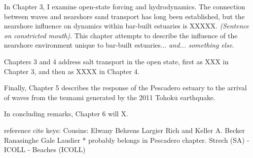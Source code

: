 In Chapter 3, I examine open-state forcing and hydrodynamics. The connection between waves and nearshore sand transport has long been established, but the nearshore influence on dynamics within bar-built estuaries is XXXXX. \emph{(Sentence on constricted mouth).} This chapter attempts to describe the influence of the nearshore environment unique to bar-built estuaries... \emph{and... something else}. 

Chapters 3 and 4 address salt transport in the open state, first as XXX in Chapter 3, and then as XXXX in Chapter 4. 

Finally, Chapter 5 describes the response of the Pescadero estuary to the arrival of waves from the tsunami generated by the 2011 Tohok$\overline{\mathrm{u}}$ earthquake. 

In concluding remarks, Chapter 6 will X. 











reference cite keys:
Cousins: \cite{cousins_effects_2010,cousins_hydrodynamics_2011}
Elwany \cite{elwany_opening_1998}
Behrens \cite{behrens_characterization_2009,behrens_episodic_2013}
Largier \cite{largier_structure_1986,slinger_evolution_1990,largier_circulation_1991,largier_dynamics_1991,largier_stratified_1992,largier_tidal_1992,largier_seasonally_1997}
Rich and Keller \cite{rich_hydrologic_2013}
A. Becker \cite{becker_artificial_2009}
Ranasinghe \cite{ranasinghe_flushing_1998,ranasinghe_circulation_1999,ranasinghe_morphodynamic_1999,ranasinghe_seasonal_2003}
Gale \cite{gale_vertical_2006,gale_processes_2007}
Laudier \cite{laudier_measured_2011} * probably belongs in Pescadero chapter.
Strech (SA) - \cite{stretch_breaching_2006,parkinson_breaching_2007}
ICOLL - \cite{haines_morphometric_2006,baldock_morphodynamic_2008,davidson_simple_2009}
\cite{uncles_infragravity_2014}
Beaches (ICOLL)  \cite{weir_beach_2006}







